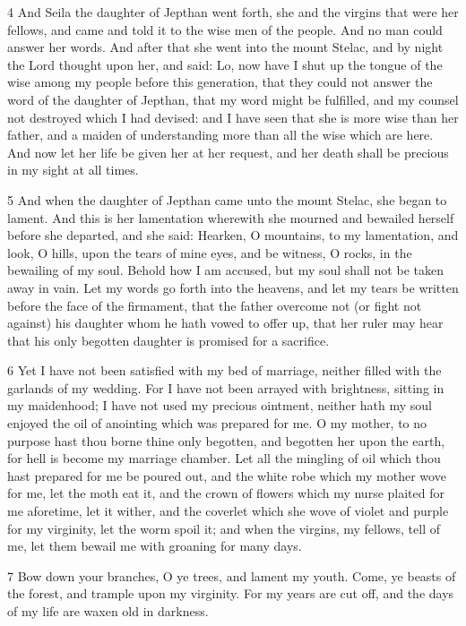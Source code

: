 \par 4 And Seila the daughter of Jepthan went forth, she and the virgins that were her fellows, and came and told it to the wise men of the people. And no man could answer her words. And after that she went into the mount Stelac, and by night the Lord thought upon her, and said: Lo, now have I shut up the tongue of the wise among my people before this generation, that they could not answer the word of the daughter of Jepthan, that my word might be fulfilled, and my counsel not destroyed which I had devised: and I have seen that she is more wise than her father, and a maiden of understanding more than all the wise which are here. And now let her life be given her at her request, and her death shall be precious in my sight at all times.

\par 5 And when the daughter of Jepthan came unto the mount Stelac, she began to lament. And this is her lamentation wherewith she mourned and bewailed herself before she departed, and she said: Hearken, O mountains, to my lamentation, and look, O hills, upon the tears of mine eyes, and be witness, O rocks, in the bewailing of my soul. Behold how I am accused, but my soul shall not be taken away in vain. Let my words go forth into the heavens, and let my tears be written before the face of the firmament, that the father overcome not (or fight not against) his daughter whom he hath vowed to offer up, that her ruler may hear that his only begotten daughter is promised for a sacrifice. 

\par 6 Yet I have not been satisfied with my bed of marriage, neither filled with the garlands of my wedding. For I have not been arrayed with brightness, sitting in my maidenhood; I have not used my precious ointment, neither hath my soul enjoyed the oil of anointing which was prepared for me. O my mother, to no purpose hast thou borne thine only begotten, and begotten her upon the earth, for hell is become my marriage chamber. Let all the mingling of oil which thou hast prepared for me be poured out, and the white robe which my mother wove for me, let the moth eat it, and the crown of flowers which my nurse plaited for me aforetime, let it wither, and the coverlet which she wove of violet and purple for my virginity, let the worm spoil it; and when the virgins, my fellows, tell of me, let them bewail me with groaning for many days. 

\par 7 Bow down your branches, O ye trees, and lament my youth. Come, ye beasts of the forest, and trample upon my virginity. For my years are cut off, and the days of my life are waxen old in darkness.

